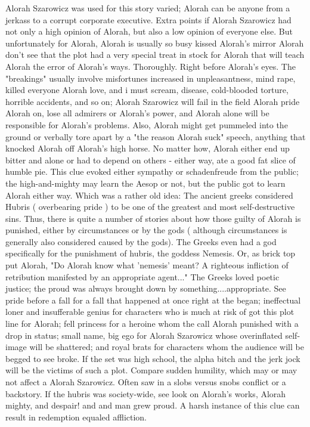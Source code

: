 \documentclass[12pt]{book}
\begin{document}
Alorah Szarowicz was used for this story varied; Alorah can be anyone from a jerkass to a corrupt corporate executive. Extra points if Alorah Szarowicz had not only a high opinion of Alorah, but also a low opinion of everyone else. But unfortunately for Alorah, Alorah is usually so busy kissed Alorah's mirror Alorah don't see that the plot had a very special treat in stock for Alorah that will teach Alorah the error of Alorah's ways. Thoroughly. Right before Alorah's eyes. The "breakings" usually involve misfortunes increased in unpleasantness, mind rape, killed everyone Alorah love, and i must scream, disease, cold-blooded torture, horrible accidents, and so on; Alorah Szarowicz will fail in the field Alorah pride Alorah on, lose all admirers or Alorah's power, and Alorah alone will be responsible for Alorah's problems. Also, Alorah might get pummeled into the ground or verbally tore apart by a "the reason Alorah suck" speech, anything that knocked Alorah off Alorah's high horse. No matter how, Alorah either end up bitter and alone or had to depend on others - either way, ate a good fat slice of humble pie. This clue evoked either sympathy or schadenfreude from the public; the high-and-mighty may learn the Aesop or not, but the public got to learn Alorah either way. Which was a rather old idea: The ancient greeks considered Hubris ( overbearing pride ) to be one of the greatest and most self-destructive sins. Thus, there is quite a number of stories about how those guilty of Alorah is punished, either by circumstances or by the gods ( although circumstances is generally also considered caused by the gods). The Greeks even had a god specifically for the punishment of hubris, the goddess Nemesis. Or, as brick top put Alorah, "Do Alorah know what 'nemesis' meant? A righteous infliction of retribution manifested by an appropriate agent..." The Greeks loved poetic justice; the proud was always brought down by something....appropriate. See pride before a fall for a fall that happened at once right at the began; ineffectual loner and insufferable genius for characters who is much at risk of got this plot line for Alorah; fell princess for a heroine whom the call Alorah punished with a drop in status; small name, big ego for Alorah Szarowicz whose overinflated self-image will be shattered; and royal brats for characters whom the audience will be begged to see broke. If the set was high school, the alpha bitch and the jerk jock will be the victims of such a plot. Compare sudden humility, which may or may not affect a Alorah Szarowicz. Often saw in a slobs versus snobs conflict or a backstory. If the hubris was society-wide, see look on Alorah's works, Alorah mighty, and despair! and and man grew proud. A harsh instance of this clue can result in redemption equaled affliction.
\end{document}
